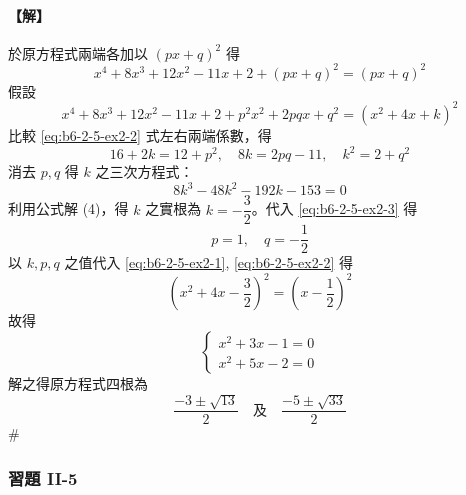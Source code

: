 \paragraph{【解】}
\setcounter{equation}{0}%
於原方程式兩端各加以 $(px+q)^2$ 得
\begin{equation}
x^4 + 8x^3 + 12x^2 - 11x + 2 + (px+q)^2 = (px+q)^2 \label{eq:b6-2-5-ex2-1}
\end{equation}
假設
\begin{equation}
x^4 + 8x^3 + 12x^2 - 11x + 2 + p^2x^2 + 2pqx + q^2 = (x^2+4x+k)^2 \label{eq:b6-2-5-ex2-2}
\end{equation}
比較 \eqref{eq:b6-2-5-ex2-2} 式左右兩端係數，得
\begin{equation}
16 + 2k = 12 + p^2, \quad 8k = 2pq - 11, \quad k^2 = 2 + q^2 \label{eq:b6-2-5-ex2-3}
\end{equation}
消去 $p, q$ 得 $k$ 之三次方程式：
\begin{equation}
8k^3 - 48k^2 - 192k - 153 = 0 \label{eq:b6-2-5-ex2-4}
\end{equation}
利用公式解 (4)，得 $k$ 之實根為 $k = -\dfrac{3}{2}$。代入 \eqref{eq:b6-2-5-ex2-3} 得
\[ p = 1, \quad q = -\dfrac{1}{2} \]
以 $k, p, q$ 之值代入 \eqref{eq:b6-2-5-ex2-1}, \eqref{eq:b6-2-5-ex2-2} 得
\[ \left(x^2+4x-\dfrac{3}{2}\right)^2 = \left(x-\dfrac{1}{2}\right)^2 \]
故得
\[ \begin{cases}
x^2 + 3x - 1 = 0 \\
x^2 + 5x - 2 = 0
\end{cases} \]
解之得原方程式四根為
\[ \dfrac{-3 \pm \sqrt{13}}{2} \quad \text{及} \quad \dfrac{-5 \pm \sqrt{33}}{2} \]\hfill$\#$

\subsubsection*{習題 II-5}\label{sec:b6-ex2-5}

